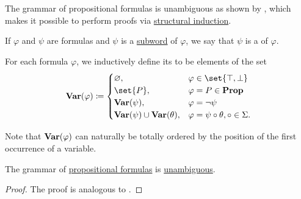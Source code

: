 \begin{definition}
\begin{thmenum}
    The grammar of propositional formulas is unambiguous as shown by , which makes it possible to perform proofs via \hyperref[rem:structural_recursion_and_induction]{structural induction}.

     If \( \varphi \) and \( \psi \) are formulas and \( \psi \) is a \hyperref[def:language/subword]{subword} of \( \varphi \), we say that \( \psi \) is a  of \( \varphi \).

     For each formula \( \varphi \), we inductively define its  to be elements of the set
    \begin{equation}\label{eq:def:propositional_syntax/varables}
      \boldop{Var}(\varphi) \coloneqq \begin{cases}
        \varnothing,                                  &\varphi \in \set{ \top, \bot } \\
        \set{ P },                                    &\varphi = P \in \boldop{Prop} \\
        \boldop{Var}(\psi),                           &\varphi = \neg \psi \\
        \boldop{Var}(\psi) \cup \boldop{Var}(\theta), &\varphi = \psi \bincirc \theta, \bincirc \in \Sigma.
      \end{cases}
    \end{equation}

    Note that \( \operatorname{\mathbf{Var}}(\varphi) \) can naturally be totally ordered by the position of the first occurrence of a variable.
  \end{thmenum}
\end{definition}

\begin{proposition}\label{thm:propositional_formulas_are_unambiguous}
  The grammar of \hyperref[def:propositional_syntax/formula]{propositional formulas} is \hyperref[def:grammar_derivation/ambiguity]{unambiguous}.
\end{proposition}
\begin{proof}
  The proof is analogous to .
\end{proof}


